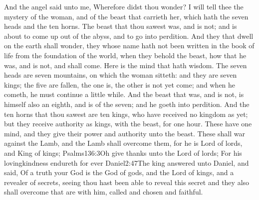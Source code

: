 And the angel said unto me, Wherefore didst thou wonder? I will tell thee the mystery of the woman, and of the beast that carrieth her, which hath the seven heads and the ten horns. 
The beast that thou sawest was, and is not; and is about to come up out of the abyss, and to go into perdition. And they that dwell on the earth shall wonder, they whose name hath not been written in the book of life from the foundation of the world, when they behold the beast, how that he was, and is not, and shall come. 
Here is the mind that hath wisdom. The seven heads are seven mountains, on which the woman sitteth: 
and they are seven kings; the five are fallen, the one is, the other is not yet come; and when he cometh, he must continue a little while. 
And the beast that was, and is not, is himself also an eighth, and is of the seven; and he goeth into perdition. 
And the ten horns that thou sawest are ten kings,%
 who have received no kingdom as yet; but they receive authority as kings, with the beast, for one hour. 
These have one mind, and they give their power and authority unto the beast. 
These shall war against the Lamb, and the Lamb shall overcome them, for he is Lord of lords, and King of kings;%
				  {Psalms}{136:3}{Oh give thanks unto the Lord of lords; For his lovingkindness endureth for ever}%
				   {Daniel}{2:47}{The king answered unto Daniel, and said, Of a truth your God is the God of gods, and the Lord of kings, and a revealer of secrets, seeing thou hast been able to reveal this secret}
 and they also shall overcome that are with him, called and chosen and faithful. 

